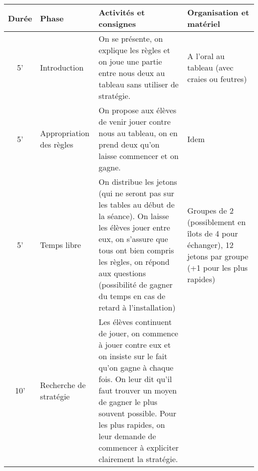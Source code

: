 \documentclass[12pt, a4paper]{article}
\begin{document}
	\begin{longtable}{c|m{3.9cm}|m{8.4cm}|m{2.4cm}}		\textbf{Durée} & \textbf{Phase} & \textbf{Activités et consignes} & \textbf{Organisation et matériel} \\ \hline\hline
		
		5' &
		
		Introduction
		
		&
		
		On se présente, on explique les règles et on joue une partie entre nous deux au tableau sans utiliser de stratégie.
		
		& 
		
		A l'oral au tableau (avec craies ou feutres)
		
		\\ \hline
		
		5' &
		
		Appropriation des règles
		
		&
		
		On propose aux élèves de venir jouer contre nous au tableau, on en prend deux qu'on laisse commencer et on gagne.
		
		& Idem
		
		\\ \hline
		
		5' & 
		
		Temps libre
		
		&
		
		On distribue les jetons (qui ne seront pas sur les tables au début de la séance).
		On laisse les élèves jouer entre eux, on s'assure que tous ont bien compris les règles, on répond aux questions (possibilité de gagner du temps en cas de retard à l'installation)
		
		& 
		
		Groupes de 2 (possiblement en îlots de 4 pour échanger), 12 jetons par groupe (+1 pour les plus rapides)
		
		\\ \hline
		
		10'
		
		&
		
		Recherche de stratégie
		
		& 
		
		Les élèves continuent de jouer, on commence à jouer contre eux et on insiste sur le fait qu'on gagne à chaque fois. On leur dit qu'il faut trouver un moyen de gagner le plus souvent possible. Pour les plus rapides, on leur demande de commencer à expliciter clairement la stratégie.
		

\end{longtable}
\end{document}
